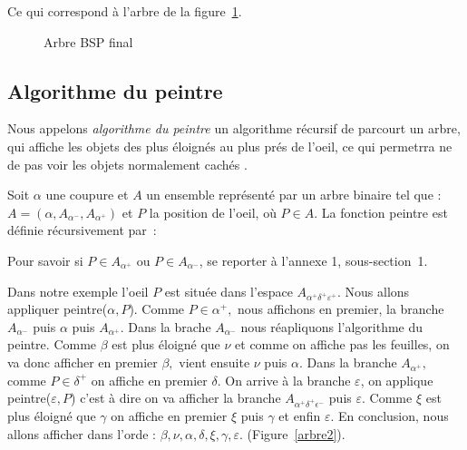 \documentclass[a4paper,11pt]{amsart}
\newcommand{\dessin}[4]{
\begin{figure}[htb]
\centering
\HideDisplacementBoxes 
\BoxedEPSF{#1 scaled #2}
\caption{#3}
\label{#4}
\end{figure}}
\begin{document}
Ce qui correspond \`a l'arbre de la figure~\ref{arbre}.
\dessin{arbre.epsf}{800}{Arbre BSP final}{arbre}



\subsection{Algorithme du peintre}
Nous appelons \emph{algorithme du peintre} un algorithme r\'ecursif 
de parcourt un arbre, qui affiche les objets des plus \'eloign\'es au plus
pr\'es de l'oeil, ce qui permetrra ne de pas voir les objets normalement
cach\'es \cite{FAQ}.

Soit $\alpha$ une coupure et $A$ un ensemble repr\'esent\'e par un 
arbre binaire tel que : $A=(\alpha,A_{\alpha^-},A_{\alpha^{+}})$ et 
$P$ la position de l'oeil, o\`u $P \in A$.  La fonction peintre est 
d\'efinie r\'ecursivement par~:

\vspace{0.1cm}
\centerline{}
\vspace{0.5cm}

Pour savoir si $P \in A_{\alpha^{+}}$ ou $P \in A_{\alpha^{-}}$, se 
reporter \`a l'annexe 1, sous-section~1.

Dans notre exemple l'oeil $P$ est situ\'ee dans l'espace 
$A_{\alpha^{+}\delta^{+}\varepsilon^{+}}$.  Nous allons appliquer 
peintre($\alpha, P$).  Comme $P \in \alpha^{+},$ nous affichons en 
premier, la branche $A_{\alpha^{-}}$ puis $\alpha$ puis 
$A_{\alpha^{+}}.$ Dans la brache $A_{\alpha^{-}}$ nous r\'eapliquons 
l'algorithme du peintre.  Comme $\beta$ est plus \'eloign\'e que $\nu$ 
et comme on affiche pas les feuilles, on va donc afficher en premier 
$\beta,$ vient ensuite $\nu$ puis $\alpha$.  Dans la branche 
$A_{\alpha^{+}},$ comme $P \in \delta^{+}$ on affiche en premier 
$\delta$.  On arrive \`a la branche $\varepsilon$, on applique 
peintre($\varepsilon, P$) c'est \`a dire on va afficher la branche 
$A_{\alpha^{+}\delta^{+}\epsilon^{-}}$ puis $\varepsilon$. Comme $\xi$
est plus \'eloign\'e que $\gamma$ on affiche en premier $\xi$ puis 
$\gamma$ et enfin $\varepsilon$. En conclusion, nous allons afficher
dans l'orde : $\beta, \nu, \alpha, \delta, \xi, \gamma, \varepsilon.$
(Figure~\ref{arbre2}).
\end{document}
